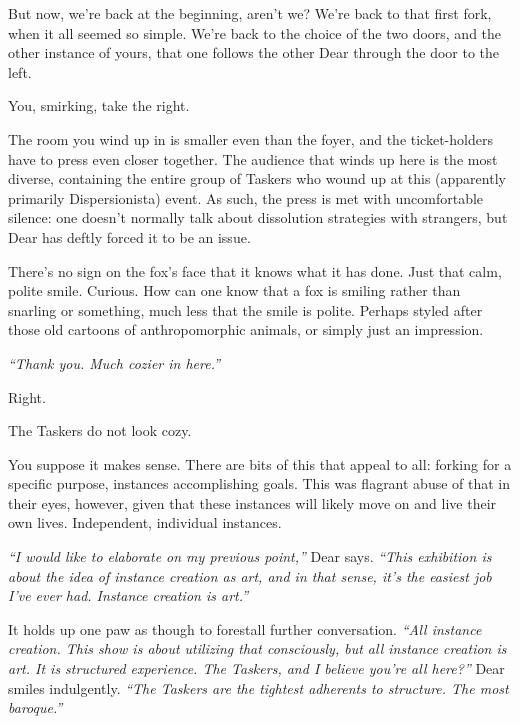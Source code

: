 \newpage
\null
\newpage
\null
\newpage

\null
\vfill

But now, we're back at the beginning, aren't we? We're back to that first fork, when it all seemed so simple. We're back to the choice of the two doors, and the other instance of yours, that one follows the other Dear through the door to the left.

You, smirking, take the right.

The room you wind up in is smaller even than the foyer, and the ticket-holders have to press even closer together. The audience that winds up here is the most diverse, containing the entire group of Taskers who wound up at this (apparently primarily Dispersionista) event. As such, the press is met with uncomfortable silence: one doesn't normally talk about dissolution strategies with strangers, but Dear has deftly forced it to be an issue.

There's no sign on the fox's face that it knows what it has done. Just that calm, polite smile. Curious. How can one know that a fox is smiling rather than snarling or something, much less that the smile is polite. Perhaps styled after those old cartoons of anthropomorphic animals, or simply just an impression.

\emph{``Thank you. Much cozier in here.''}

\vfill

\newpage

\null
\vfill

Right.

\null
\vfill

The Taskers do not look cozy.

\null
\vfill

\newpage

\null
\vfill

You suppose it makes sense. There are bits of this that appeal to all: forking for a specific purpose, instances accomplishing goals. This was flagrant abuse of that in their eyes, however, given that these instances will likely move on and live their own lives. Independent, individual instances.

\emph{``I would like to elaborate on my previous point,''} Dear says. \emph{``This exhibition is about the idea of instance creation as art, and in that sense, it's the easiest job I've ever had. Instance creation is art.''}

It holds up one paw as though to forestall further conversation. \emph{``All instance creation. This show is about utilizing that consciously, but all instance creation is art. It is structured experience. The Taskers, and I believe you're all here?''} Dear smiles indulgently. \emph{``The Taskers are the tightest adherents to structure. The most baroque.''}

